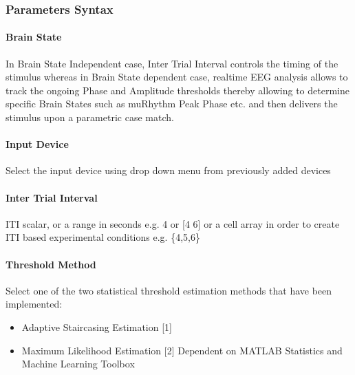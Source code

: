 \documentclass[letterpaper,10pt,english]{sphinxmanual}
\begin{document}
\subsubsection{Parameters Syntax}
\label{\detokenize{7_MEPThresholdHunting:parameters-syntax}}

\paragraph{Brain State}
\label{\detokenize{7_MEPThresholdHunting:brain-state}}
\sphinxAtStartPar
In Brain State Independent case, Inter Trial Interval controls the timing of the stimulus whereas in Brain State dependent case, real\sphinxhyphen{}time EEG analysis allows to track the ongoing Phase and Amplitude thresholds thereby allowing to determine specific Brain States such as mu\sphinxhyphen{}Rhythm Peak Phase etc. and then delivers the stimulus upon a parametric case match.


\paragraph{Input Device}
\label{\detokenize{7_MEPThresholdHunting:input-device}}
\sphinxAtStartPar
Select the input device using drop down menu from previously added devices


\paragraph{Inter Trial Interval}
\label{\detokenize{7_MEPThresholdHunting:inter-trial-interval}}
\sphinxAtStartPar
ITI scalar, or a range in seconds e.g. 4 or {[}4 6{]} or a cell array in order to create ITI based experimental conditions e.g. \{4,5,6\}


\paragraph{Threshold Method}
\label{\detokenize{7_MEPThresholdHunting:threshold-method}}
\sphinxAtStartPar
Select one of the two statistical threshold estimation methods that have been implemented:
\begin{itemize}
\item {} 
\sphinxAtStartPar
Adaptive Staircasing Estimation {[}1{]}

\item {} 
\sphinxAtStartPar
Maximum Likelihood Estimation {[}2{]} \textendash{} Dependent on MATLAB Statistics and Machine Learning Toolbox

\end{itemize}
\end{document}
